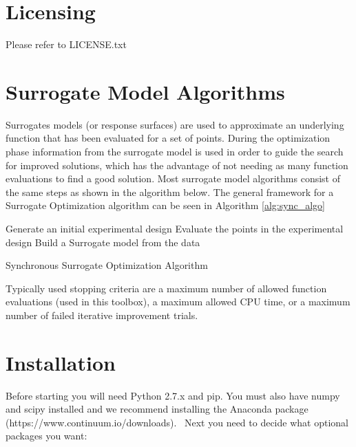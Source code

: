 \documentclass[]{article}
\begin{document}
\section{Licensing} Please refer to LICENSE.txt

\section{Surrogate Model Algorithms}
Surrogates models (or response surfaces) are used to approximate an underlying function that has 
been evaluated for a set of points. During the optimization phase information from the surrogate model 
is used in order to guide the search for improved solutions, which has the advantage of not needing as
many function evaluations to find a good solution. Most surrogate model algorithms consist of the same 
steps as shown in the algorithm below. The general framework for a Surrogate Optimization algorithm 
can be seen in Algorithm \ref{alg:sync_algo}

\begin{algorithm}[!h]
\LinesNumbered
{}


Generate an initial experimental design\;{\label{restart}}
Evaluate the points in the experimental design\;
Build a Surrogate model from the data\;
\caption{Synchronous Surrogate Optimization Algorithm}
\label{alg:sync_algo}
\end{algorithm} 

\noindent Typically used stopping criteria are a maximum number of allowed function evaluations 
(used in this toolbox), a maximum allowed CPU time, or a maximum number of failed iterative 
improvement trials.

\section{Installation}
Before starting you will need Python 2.7.x and pip. You must also have numpy and scipy 
installed and we recommend installing the Anaconda package \newline 
(https://www.continuum.io/downloads). \newline \ \newline Next you need to decide what 
optional packages you want:
\end{document}
